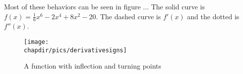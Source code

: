 Most of these behaviors can be seen in figure ...  The solid curve is $f(x)=\frac{1}{6}x^6
-2x^4+8x^2-20$.  The dashed curve is $f'(x)$ and the dotted is $f''(x)$.

\begin{figure}\label{derivativesigns}
\begin{centering}
\texttt{[image: \\chapdir/pics/derivativesigns]}
\caption{A function with inflection and turning points}
\end{centering}
\end{figure}


